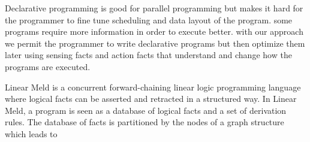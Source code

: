 Declarative programming is good for parallel programming but makes it hard for
the programmer to fine tune scheduling and data layout of the program.
some programs require more information in order to execute better.
with our approach we permit the programmer to write declarative programs
but then optimize them later using sensing facts and action facts that
understand and change how the programs are executed.

Linear Meld is a concurrent forward-chaining linear logic programming
language where logical facts can be asserted and retracted in a
structured way. In Linear Meld, a program is seen as a database of
logical facts and a set of derivation rules. The database of facts is
partitioned by the nodes of a graph structure which leads to
